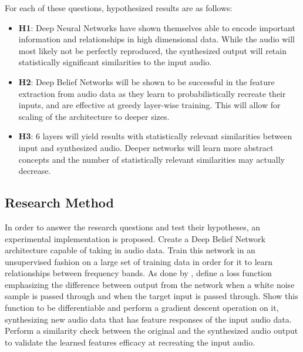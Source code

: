 \documentclass[12pt]{article}
\begin{document}
For each of these questions, hypothesized results are as follows:

\begin{itemize}
\item \textbf{H1}: Deep Neural Networks have shown themselves able to encode important information and relationships in high dimensional data. While the audio will most likely not be perfectly reproduced, the synthesized output will retain statistically significant similarities to the input audio. 
\item \textbf{H2}: Deep Belief Networks will be shown to be successful in the feature extraction from audio data as they learn to probabilistically recreate their inputs, and are effective at greedy layer-wise training. This will allow for scaling of the architecture to deeper sizes. 
\item \textbf{H3}: 6 layers will yield results with statistically relevant similarities between input and synthesized audio. Deeper networks will learn more abstract concepts and the number of statistically relevant similarities may actually decrease.

\end{itemize}

\subsection{Research Method}
In order to answer the research questions and test their hypotheses, an experimental implementation is proposed. Create a Deep Belief Network architecture capable of taking in audio data. Train this network in an unsupervised fashion on a large set of training data in order for it to learn relationships between frequency bands. As done by \citet{gatys2015neural}, define a loss function emphasizing the difference between output from the network when a white noise sample is passed through and when the target input is passed through. Show this function to be differentiable and perform a gradient descent operation on it, synthesizing new audio data that has feature responses of the input audio data. Perform a similarity check between the original and the synthesized audio output to validate the learned features efficacy at recreating the input audio.
\end{document}
